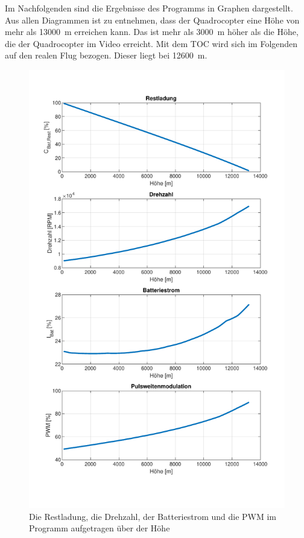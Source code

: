 Im Nachfolgenden sind die Ergebnisse des Programms in Graphen dargestellt. Aus allen Diagrammen ist zu entnehmen, dass der Quadrocopter eine Höhe von mehr als \SI{13000}{m} erreichen kann. Das ist mehr als \SI{3000}{m} höher als die Höhe, die der Quadrocopter im Video erreicht. Mit dem TOC wird sich im Folgenden auf den realen Flug bezogen. Dieser liegt bei \SI{12600}{m}.\\
\begin{figure}[H]
\centering
	\includegraphics{Diagramme/Russland.pdf}
	\caption{Die Restladung, die Drehzahl, der Batteriestrom und die PWM im Programm aufgetragen über der Höhe}
	\label{abb:ergebnisse_russland}
\end{figure}
